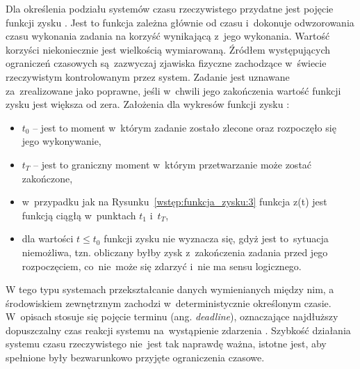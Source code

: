 Dla określenia podziału systemów czasu rzeczywistego przydatne jest pojęcie funkcji zysku \cite{rts}. Jest to funkcja zależna głównie od czasu i~dokonuje odwzorowania czasu wykonania zadania na korzyść wynikającą z~jego wykonania. Wartość korzyści niekoniecznie jest wielkością wymiarowaną. Źródłem występujących ograniczeń czasowych są~zazwyczaj zjawiska fizyczne zachodzące w~świecie rzeczywistym kontrolowanym przez system. Zadanie jest uznawane za~zrealizowane jako poprawne, jeśli w~chwili jego zakończenia wartość funkcji zysku jest większa od zera.
\clearpage
Założenia dla wykresów funkcji zysku \cite{rts}:
\begin{itemize}
\item $t_0$ -- jest to moment w~którym zadanie zostało zlecone oraz rozpoczęło się jego wykonywanie,
\item $t_T$ -- jest to graniczny moment w~którym przetwarzanie może zostać zakończone,
\item w~przypadku jak na Rysunku~\ref{wstęp:funkcja_zysku:3} funkcja z(t) jest funkcją ciągłą w~punktach $t_1$ i~$t_T$,
\item dla wartości $t \leq t_0$ funkcji zysku nie wyznacza się, gdyż jest to~sytuacja niemożliwa, tzn. obliczany byłby zysk z~zakończenia zadania przed jego rozpoczęciem, co~nie~może się zdarzyć i~nie ma sensu logicznego.
\end{itemize}

W tego typu systemach przekształcanie danych wymienianych między nim, a środowiskiem zewnętrznym zachodzi w~deterministycznie określonym czasie. W~opisach stosuje się pojęcie terminu (ang. \textit{deadline}), oznaczające najdłuższy dopuszczalny czas reakcji systemu na~wystąpienie zdarzenia \cite{rts}. Szybkość działania systemu czasu rzeczywistego nie~jest tak naprawdę ważna, istotne jest, aby spełnione były bezwarunkowo przyjęte ograniczenia czasowe.

